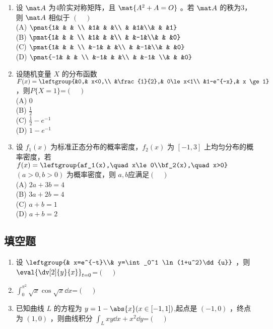 \begin{enumerate}
\item 设 $\mat A$ 为4阶实对称矩阵，且 $\mat {A^2+A=O}$  。若 $\mat A$ 的秩为3，则 $\mat A$  相似于 $(\quad )$\\
(A) $\pmat{1& & &  \\ &1& & &\\ & &1&\\& & &1}$\\
(B) $\pmat{1& & &  \\ &1& & &\\ & &-1&\\& & &0}$\\
(C) $\pmat{1& & &  \\ &-1& & &\\ & &-1&\\& & &0}$\\
(D) $\pmat{-1& & & \\ &-1& & &\\ & &-1& \\& & &0}$
\item  设随机变量 $X$ 的分布函数 $F(x)=\leftgroup{&0,& x<0,\\ &\frac{1}{2},& 0\le x<1\\ &1-e^{-x},& x \ge 1}$   ，则$P\{X=1\}$=$(\quad )$\\
(A)  $0$\\
(B) $\frac{1}{2}$\\
(C)  $\frac{1}{2}-e^{-1}$\\
(D) $1-e^{-1}$
\item  设 $f_1(x)$ 为标准正态分布的概率密度，$f_2(x)$   为 $[-1,3]$ 上均匀分布的概率密度，若 $f(x)=\leftgroup{af_1(x),\quad x\le0\\bf_2(x),\quad x>0}\quad $ $(a>0,b>0)$ 为概率密度，则 $a,b$应满足$(\quad )$\\
(A) $2a+3b=4$\\
(B)   $3a+2b=4$\\
(C)  $a+b=1$\\
(D)   $a+b=2$
\end{enumerate}
\subsection{填空题}
\begin{enumerate}
\item 设 $\leftgroup{& x=e^{-t}\\& y=\int_0^1 \ln(1+u^2)\dd{u}}$   ，则 $\displaystyle \eval{\dv[2]{y}{x}}_{t=0}$=$(\quad )$
\item $\int_0^{\pi^2}\sqrt{x}\cos \sqrt{x}\dd{x}$=$(\quad )$
\item  已知曲线 $L$ 的方程为 $y=1-\abs{x} (x \in [-1,1])$,起点是 $(-1,0)$ ，终点为 $(1,0)$ ，则曲线积分 $\displaystyle \int_L xy\dd{x}+x^2\dd{y}$=$(\quad )$
\end{enumerate}